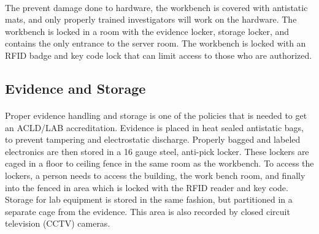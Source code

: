 \documentclass[12pt]{article}
\begin{document}
\paragraph{}
The prevent damage done to hardware, the workbench is covered with antistatic mats, and only properly trained investigators will work on the hardware.
The workbench is locked in a room with the evidence locker, storage locker, and contains the only entrance to the server room.
The workbench is locked with an RFID badge and key code lock that can limit access to those who are authorized.

\subsection{Evidence and Storage}
\paragraph{}
Proper evidence handling and storage is one of the policies that is needed to get an ACLD/LAB accreditation.
Evidence is placed in heat sealed antistatic bags, to prevent tampering and electrostatic discharge.
Properly bagged and labeled electronics are then stored in a 16 gauge steel, anti-pick locker.
These lockers are caged in a floor to ceiling fence in the same room as the workbench.  
To access the lockers, a person needs to access the building, the work bench room, and finally into the fenced in area which is locked with the RFID reader and key code.
Storage for lab equipment is stored in the same fashion, but partitioned in a separate cage from the evidence.
This area is also recorded by closed circuit television (CCTV) cameras. 
\end{document}
